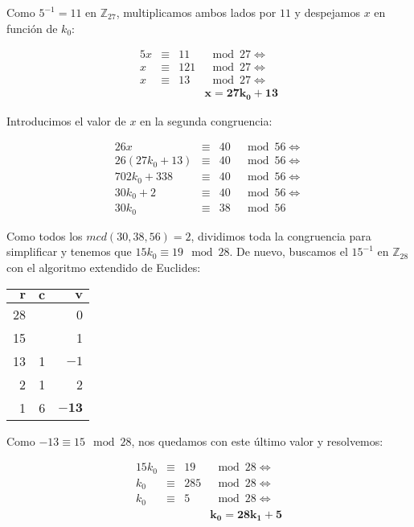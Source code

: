 Como $5^{-1} = 11$ en $\mathbb{Z}_{27}$, multiplicamos ambos lados por $11$ y despejamos $x$ en función de $k_0$:

\[
\begin{array}{rcrl}
	5x & \equiv & 11  & \mod 27 \iff \\
	x  & \equiv & 121 & \mod 27 \iff \\
	x  & \equiv & 13  & \mod 27 \iff \\
		&        &     & \boldsymbol{x = 27k_0 + 13}
\end{array}
\]

Introducimos el valor de $x$ en la segunda congruencia:

\[
\begin{array}{rcrl}
	26x            & \equiv & 40 & \mod 56 \iff \\
	26(27k_0 + 13) & \equiv & 40 & \mod 56 \iff \\
	702k_0 + 338   & \equiv & 40 & \mod 56 \iff \\
	30k_0 + 2      & \equiv & 40 & \mod 56 \iff \\
	30k_0          & \equiv & 38 & \mod 56
\end{array}
\]

Como todos los $mcd(30,38,56) = 2$, dividimos toda la congruencia para simplificar y tenemos que $15k_0 \equiv 19 \mod 28$.
De nuevo, buscamos el $15^{-1}$ en $\mathbb{Z}_{28}$ con el algoritmo extendido de Euclides:

\begin{center}
\begin{tabular}{r r r}
	$\boldsymbol{r}$ & $\boldsymbol{c}$ & $\boldsymbol{v}$   \\
	\toprule
	28               &                  & 0                  \\
	15               &                  & 1                  \\
	13               & 1                & $-1$               \\
	2                & 1                & 2                  \\
	1                & 6                & $\boldsymbol{-13}$ \\
\end{tabular}
\end{center}

Como $-13 \equiv 15 \mod 28$, nos quedamos con este último valor y resolvemos:

\[
\begin{array}{rcrl}
	15k_0 & \equiv & 19  & \mod 28 \iff \\
	k_0   & \equiv & 285 & \mod 28 \iff \\
	k_0   & \equiv & 5   & \mod 28 \iff \\
         &        &     & \boldsymbol{k_0 = 28k_1 + 5}
\end{array}
\]

